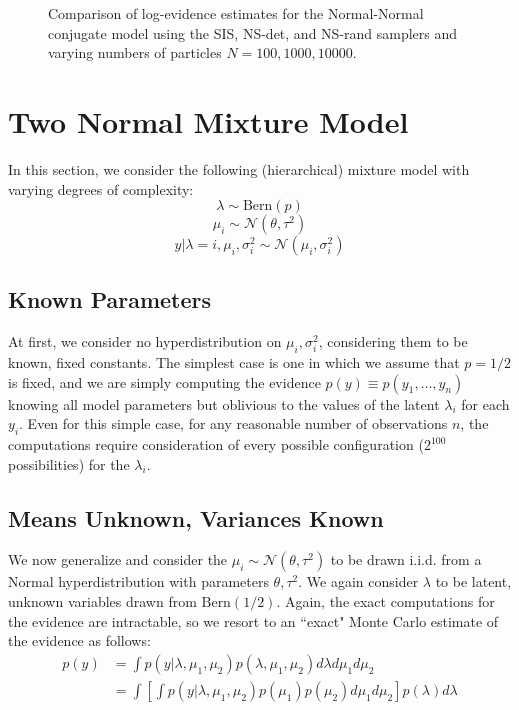 \documentclass[psamsfonts]{amsart}
\begin{document}
\begin{figure}
\caption{Comparison of log-evidence estimates for the Normal-Normal conjugate model using the SIS, NS-det, and NS-rand samplers and varying numbers of particles $N = 100, 1000, 10000$.}
\end{figure}



\section{Two Normal Mixture Model}

In this section, we consider the following (hierarchical) mixture model with varying degrees of complexity:
$$\lambda \sim \text{Bern}(p)$$
$$\mu_i \sim \mathcal{N}(\theta, \tau^2)$$
$$y|\lambda = i, \mu_i, \sigma_i^2 \sim \mathcal{N}(\mu_i, \sigma_i^2)$$

\subsection{Known Parameters}

At first, we consider no hyperdistribution on $\mu_i, \sigma_i^2$, considering them to be known, fixed constants. The simplest case is one in which we assume that $p = 1/2$ is fixed, and we are simply computing the evidence $p(y) \equiv p(y_1, \dots, y_n)$ knowing all model parameters but oblivious to the values of the latent $\lambda_i$ for each $y_i$. Even for this simple case, for any reasonable number of observations $n$, the computations require consideration of every possible configuration ($2^{100}$ possibilities) for the $\lambda_i$. 

\subsection{Means Unknown, Variances Known}

We now generalize and consider the $\mu_i \sim \mathcal{N}(\theta, \tau^2)$ to be drawn i.i.d. from a Normal hyperdistribution with parameters $\theta, \tau^2$. We again consider $\lambda$ to be latent, unknown variables drawn from $\text{Bern}(1/2)$. Again, the exact computations for the evidence are intractable, so we resort to an ``exact" Monte Carlo estimate of the evidence as follows:
\begin{align*}
p(y) &= \int p(y|\lambda, \mu_1, \mu_2) p(\lambda, \mu_1, \mu_2) d\lambda d\mu_1 d\mu_2 \\
&= \int \left[ \int p(y|\lambda, \mu_1,\mu_2)p(\mu_1)p(\mu_2) d\mu_1 d\mu_2\right] p(\lambda) d\lambda
\end{align*}
\end{document}

